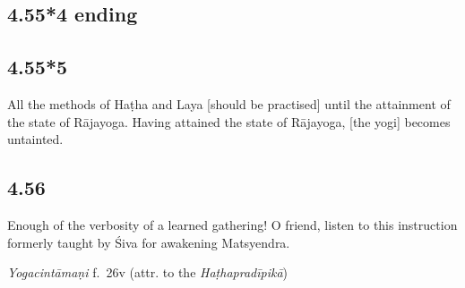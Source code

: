 \begin{ekdosis}
\subsection*{4.55*4 ending}
\begin{translation}[hp04_055_4p]
\end{translation}



\subsection*{4.55*5}
\begin{translation}[hp04_055_5]
All the methods of Haṭha and Laya [should be practised] until the attainment of the state of Rājayoga. Having attained the state of Rājayoga, [the yogi] becomes untainted.
\end{translation}




\subsection*{4.56}
\begin{translation}[hp04_056]
Enough of the verbosity of a learned gathering! O friend, listen to this instruction formerly taught by Śiva for awakening Matsyendra.
\end{translation}


\begin{testimonia}[hp04_056]
\emph{Yogacintāmaṇi} f.~26v (attr. to the \emph{Haṭhapradīpikā})
\begin{versinnote}
\end{versinnote}
\end{testimonia}


\end{ekdosis}
